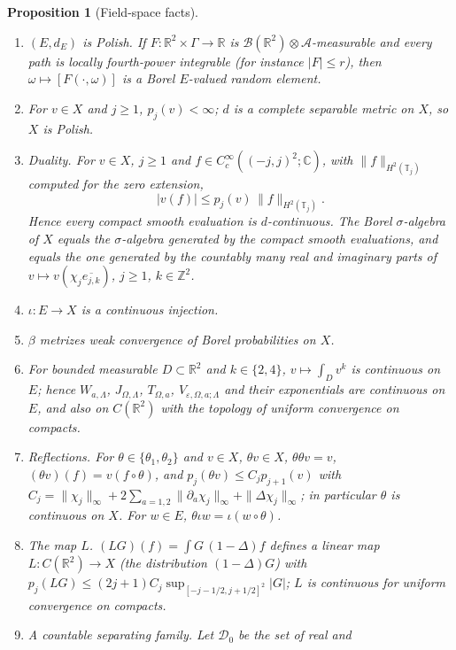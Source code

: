 \documentclass[11pt]{article}
\theoremstyle{plain}
\newtheorem{proposition}[theorem]{Proposition}
\theoremstyle{definition}
\theoremstyle{remark}
\newcommand{\R}{\mathbb{R}}
\newcommand{\C}{\mathbb{C}}
\newcommand{\Z}{\mathbb{Z}}
\newcommand{\T}{\mathbb{T}}
\newcommand{\cB}{\mathcal{B}}
\newcommand{\cD}{\mathcal{D}}
\newcommand{\cA}{\mathcal{A}}
\newcommand{\conj}[1]{\overline{#1}}
\begin{document}
\begin{proposition}[Field-space facts]\label{prop:space}
\begin{enumerate}[label=(\roman*)]
\item $(E,d_E)$ is Polish. If $F:\R^{2}\times\Gamma\to\R$ is
  $\cB(\R^{2})\otimes\cA$-measurable and every path is locally fourth-power
  integrable (for instance $|F|\le r$), then $\omega\mapsto[F(\cdot,\omega)]$ is a
  Borel $E$-valued random element.
\item For $v\in X$ and $j\ge1$, $p_j(v)<\infty$; $d$ is a complete separable metric
  on $X$, so $X$ is Polish.
\item \emph{Duality.} For $v\in X$, $j\ge1$ and $f\in C_c^{\infty}((-j,j)^{2};\C)$,
  with $\|f\|_{H^{2}(\T_j)}$ computed for the zero extension,
  \begin{equation}\label{eq:duality}
  |v(f)|\le p_j(v)\,\|f\|_{H^{2}(\T_j)} .
  \end{equation}
  Hence every compact smooth evaluation is $d$-continuous. The Borel
  $\sigma$-algebra of $X$ equals the $\sigma$-algebra generated by the compact
  smooth evaluations, and equals the one generated by the countably many real
  and imaginary parts of $v\mapsto v(\chi_j\conj{e_{j,k}})$, $j\ge1$, $k\in\Z^{2}$.
\item $\iota:E\to X$ is a continuous injection.
\item $\beta$ metrizes weak convergence of Borel probabilities on $X$.
\item For bounded measurable $D\subset\R^{2}$ and $k\in\{2,4\}$, $v\mapsto\int_Dv^{k}$ is
  continuous on $E$; hence $W_{a,\Lambda}$, $J_{\Omega,\Lambda}$, $T_{\Omega,a}$,
  $V_{\varepsilon,\Omega,a;\Lambda}$ and their exponentials are continuous on $E$,
  and also on $C(\R^{2})$ with the topology of uniform convergence on compacts.
\item \emph{Reflections.} For $\theta\in\{\theta_1,\theta_2\}$ and $v\in X$,
  $\theta v\in X$, $\theta\theta v=v$, $(\theta v)(f)=v(f\circ\theta)$, and
  $p_j(\theta v)\le C_jp_{j+1}(v)$ with
  $C_j=\|\chi_j\|_\infty+2\sum_{a=1,2}\|\partial_a\chi_j\|_\infty+\|\Delta\chi_j\|_\infty$; in
  particular $\theta$ is continuous on $X$. For $w\in E$, $\theta\iota w=\iota(w\circ\theta)$.
\item \emph{The map $L$.} $(LG)(f)=\int G\,(1-\Delta)f$ defines a linear map
  $L:C(\R^{2})\to X$ (the distribution $(1-\Delta)G$) with
  $p_j(LG)\le(2j+1)C_j\sup_{[-j-1/2,j+1/2]^{2}}|G|$; $L$ is continuous for uniform
  convergence on compacts.
\item \emph{A countable separating family.} Let $\cD_0$ be the set of real and

\end{enumerate}
\end{proposition}
\end{document}
